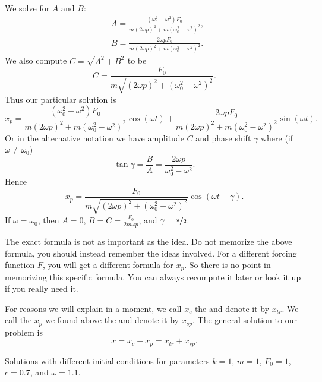 We solve for $A$ and $B$:
\begin{align*}
& A=\frac{(\omega_0^2-\omega^2) F_0}
{m{(2\omega p)}^2+m{(\omega_0^2-\omega^2)}^2} , \\
& B=\frac{2 \omega p F_0}
{m{(2\omega p)}^2+m{(\omega_0^2-\omega^2)}^2} .
\end{align*}
We also compute $C = \sqrt{A^2+B^2}$
to be
\begin{equation*}
C = \frac{F_0}{m \sqrt{{(2\omega p)}^2+{(\omega_0^2-\omega^2)}^2}} .
\end{equation*}
Thus our particular solution is
\begin{equation*}
x_p = 
\frac{(\omega_0^2-\omega^2) F_0}
{m{(2\omega p)}^2+m{(\omega_0^2-\omega^2)}^2} \cos (\omega t) +
\frac{2 \omega p F_0}
{m{(2\omega p)}^2+m{(\omega_0^2-\omega^2)}^2} \sin (\omega t) .
\end{equation*}
Or in the alternative notation we have amplitude $C$ and phase shift $\gamma$
where (if $\omega \not= \omega_0$)
\begin{equation*}
\tan \gamma = \frac{B}{A} = \frac{2\omega p}{\omega_0^2-\omega^2} .
\end{equation*}
Hence
\begin{equation*}
\boxed{~~
x_p = 
\frac{F_0}{m \sqrt{{(2\omega p)}^2+{(\omega_0^2-\omega^2)}^2}} 
\cos ( \omega t - \gamma ) .
~~}
\end{equation*}
If $\omega = \omega_0$, then $A=0$, $B = C = \frac{F_0}{2m\omega p}$,
and $\gamma = \nicefrac{\pi}{2}$.

The exact formula is not as important as the idea.  Do not memorize
the above formula, you should instead remember the ideas involved.
For a different forcing function $F$, you will get a different formula
for $x_p$.
So there is no point in memorizing this specific
formula.  You can always recompute it later or look it up if you really need
it.

\medskip

For reasons we will explain in a moment, we call $x_c$ the
\emph{}
and denote it by $x_{tr}$.  We call the
$x_p$ we found above the \emph{} and denote it
by $x_{sp}$.
The general solution to our problem is
\begin{equation*}
x = x_c + x_p = x_{tr} + x_{sp} .
\end{equation*}

\begin{mywrapfig}{3.25in}
\capstart
{}
\caption{Solutions with different initial conditions for parameters
$k=1$, $m=1$, $F_0 = 1$, $c=0.7$, and $\omega=1.1$.\label{3.6:transbehfig}}
\end{mywrapfig}
%
%

